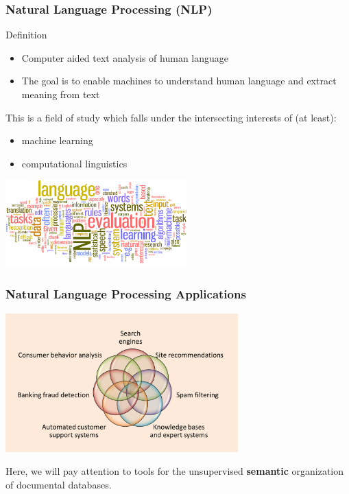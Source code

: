 \documentclass{beamer}
\begin{document}
\begin{frame}

	\frametitle{Natural Language Processing (NLP)}
	
	\begin{block}{Definition}
	\begin{itemize}
		\item Computer aided text analysis of human language
		\item The goal is to enable machines to understand human language and extract meaning from text
	\end{itemize}
	\end{block}
	
	This is a field of study which falls under the intersecting interests of (at least):
	\begin{itemize}
		\item machine learning
		\item computational linguistics
	\end{itemize}

\centerline{\includegraphics[width=7cm]{./figs/NLPTM_wordcloud.png}}

\end{frame}

\begin{frame}

	\frametitle{Natural Language Processing Applications}

\centerline{\includegraphics[width=9cm]{./figs/NLPTM_applications.png}}

\vspace{.3cm}
Here, we will pay attention to tools for the unsupervised {\bf semantic} organization of documental databases.

\end{frame}
\end{document}
